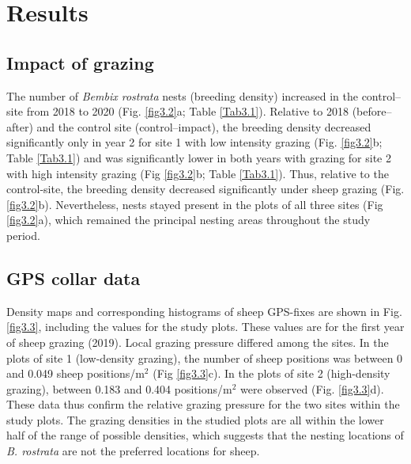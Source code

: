 \documentclass[10pt, twoside]{book} %
\begin{document}
	\clearpage
	

	\section{Results}
	\subsection{Impact of grazing}
	The number of \textit{Bembix rostrata} nests (breeding density) increased in the control--site from 2018 to 2020 (Fig. \ref{fig3.2}a; Table \ref{Tab3.1}). Relative to 2018 (before--after) and the control site (control--impact), the breeding density decreased significantly only in year 2 for site 1 with low intensity grazing (Fig. \ref{fig3.2}b; Table \ref{Tab3.1}) and was significantly lower in both years with grazing for site 2 with high intensity grazing (Fig \ref{fig3.2}b; Table \ref{Tab3.1}). Thus, relative to the control-site, the breeding density decreased significantly under sheep grazing (Fig. \ref{fig3.2}b). Nevertheless, nests stayed present in the plots of all three sites (Fig \ref{fig3.2}a), which remained the principal nesting areas throughout the study period.\\
	
	\subsection{GPS collar data}
	Density maps and corresponding histograms of sheep GPS-fixes are shown in Fig. \ref{fig3.3}, including the values for the study plots. These values are for the first year of sheep grazing (2019). Local grazing pressure differed among the sites. In the plots of site 1 (low-density grazing), the number of sheep positions was between 0 and 0.049 sheep positions/m$^2$ (Fig \ref{fig3.3}c). In the plots of site 2 (high-density grazing), between 0.183 and 0.404 positions/m$^2$ were observed (Fig. \ref{fig3.3}d). These data thus confirm the relative grazing pressure for the two sites within the study plots. The grazing densities in the studied plots are all within the lower half of the range of possible densities, which suggests that the nesting locations of \textit{B. rostrata} are not the preferred locations for sheep.\\
	
\end{document}
